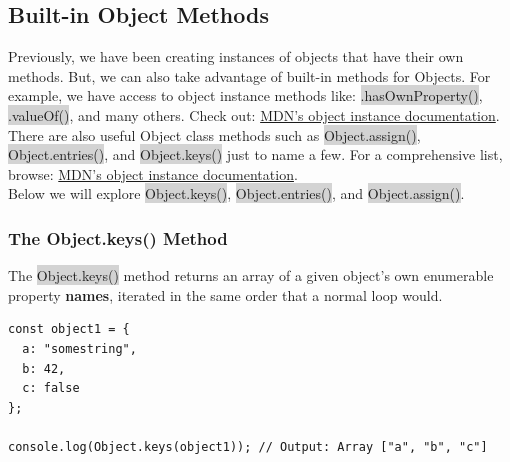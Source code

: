 \documentclass[11pt]{article}
\begin{document}
\subsection{Built-in Object Methods}
Previously, we have been creating instances of objects that have their own methods. But, we can also take advantage of built-in methods for Objects. For example, we have access to object instance methods like: \colorbox{lightgray}{.hasOwnProperty()}, \colorbox{lightgray}{.valueOf()}, and many others. Check out: \href{https://developer.mozilla.org/en-US/docs/Web/JavaScript/Reference/Global_Objects/Object#Methods}{MDN’s object instance documentation}. \\
\newline
There are also useful Object class methods such as \colorbox{lightgray}{Object.assign()}, \colorbox{lightgray}{Object.entries()}, and \colorbox{lightgray}{Object.keys()} just to name a few. For a comprehensive list, browse: \href{https://developer.mozilla.org/en-US/docs/Web/JavaScript/Reference/Global_Objects/Object#Methods_of_the_Object_constructor}{MDN’s object instance documentation}. \\
\newline
Below we will explore \colorbox{lightgray}{Object.keys()}, \colorbox{lightgray}{Object.entries()}, and \colorbox{lightgray}{Object.assign()}. 
\subsubsection{The Object.keys() Method}
The \colorbox{lightgray}{Object.keys()} method returns an array of a given object's own enumerable property \textbf{names}, iterated in the same order that a normal loop would.
\begin{lstlisting}
const object1 = {
  a: "somestring",
  b: 42,
  c: false
};

console.log(Object.keys(object1)); // Output: Array ["a", "b", "c"]
\end{lstlisting}
\end{document}
